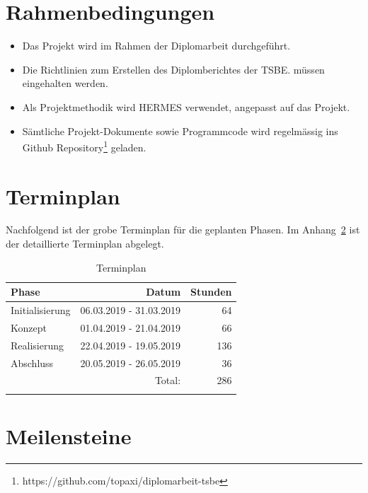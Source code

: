 

\section{Rahmenbedingungen}\label{rahmenbedingungen}

\begin{itemize}
  \item{}
    Das Projekt wird im Rahmen der Diplomarbeit durchgeführt.
  \item{}
    Die Richtlinien zum Erstellen des Diplomberichtes der TSBE.
    müssen eingehalten werden.
  \item{}
    Als Projektmethodik wird HERMES verwendet, angepasst auf das Projekt.
  \item{}
    Sämtliche Projekt-Dokumente sowie Programmcode wird regelmässig ins Github
    Repository\footnote{https://github.com/topaxi/diplomarbeit-tsbe} geladen.
\end{itemize}


\clearpage
\section{Terminplan}\label{terminplan}

Nachfolgend ist der grobe Terminplan für die geplanten Phasen. Im Anhang~\ref{terminplan} ist
der detaillierte Terminplan abgelegt.

\begin{longtable}[]{@{}lrr@{}}
  \toprule
  Phase           & Datum                   & Stunden\tabularnewline
  \midrule
  \endhead
  Initialisierung & 06.03.2019 - 31.03.2019 & 64\tabularnewline
  Konzept         & 01.04.2019 - 21.04.2019 & 66\tabularnewline
  Realisierung    & 22.04.2019 - 19.05.2019 & 136\tabularnewline
  Abschluss       & 20.05.2019 - 26.05.2019 & 36\tabularnewline
  \midrule
                  & Total:                  & 286\tabularnewline
  \bottomrule
  \caption{Terminplan}
\end{longtable}


\section{Meilensteine}\label{meilensteine}

